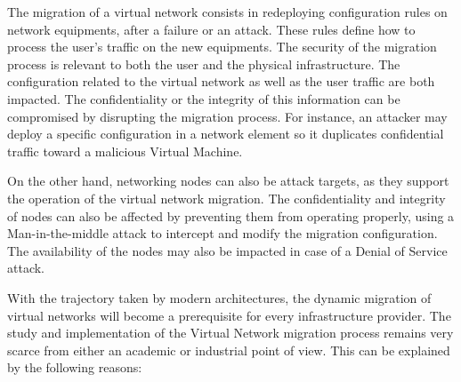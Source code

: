 The migration of a virtual network consists in redeploying configuration rules on network equipments, after a failure or an attack. These rules define how to process the user's traffic on the new equipments.
The security of the migration process is relevant to both the user and the physical infrastructure.
The configuration related to the virtual network as well as the user traffic are both impacted. 
The confidentiality or the integrity of this information can be compromised by disrupting the migration process. For instance,  an attacker may deploy a specific configuration in a network element so it duplicates confidential traffic toward a malicious Virtual Machine.

On the other hand, networking nodes can also be attack targets, as they support the operation of the virtual network migration.
The confidentiality and integrity of nodes can also be affected by preventing them from operating properly, \eg using a Man-in-the-middle attack to intercept and modify the migration configuration. The availability of the nodes may also be impacted in case of a Denial of Service attack.

With the trajectory taken by modern architectures, the dynamic migration of virtual networks will become a prerequisite for every infrastructure provider.
The study and implementation of the Virtual Network migration process remains very scarce from either an academic or industrial point of view. This can be explained by the following reasons:


